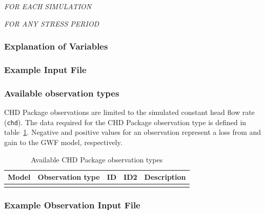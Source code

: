 \noindent \textit{FOR EACH SIMULATION}


\vspace{5mm}
\noindent \textit{FOR ANY STRESS PERIOD}

\packageperioddescription

\vspace{5mm}
\subsubsection{Explanation of Variables}
\begin{description}

\end{description}

\vspace{5mm}
\subsubsection{Example Input File}


\vspace{5mm}
\subsubsection{Available observation types}
CHD Package observations are limited to the simulated constant head flow rate (\texttt{chd}). The data required for the CHD Package observation type is defined in table~\ref{table:gwf-chdobstype}. Negative and positive values for an observation represent a loss from and gain to the GWF model, respectively.

\begin{longtable}{p{2cm} p{2.75cm} p{2cm} p{1.25cm} p{7cm}}
\caption{Available CHD Package observation types} \tabularnewline

\hline
\hline
\textbf{Model} & \textbf{Observation type} & \textbf{ID} & \textbf{ID2} & \textbf{Description} \\
\hline
\endhead

\hline
\endfoot


\label{table:gwf-chdobstype}
\end{longtable}

\vspace{5mm}
\subsubsection{Example Observation Input File}


